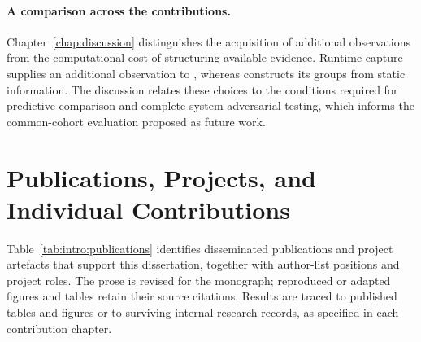 \paragraph{A comparison across the contributions.}
Chapter~\ref{chap:discussion} distinguishes the acquisition of additional observations
from the computational cost of structuring available evidence. Runtime capture supplies
an additional observation to \hybroid{}, whereas \hgann{} constructs its groups from
static information. The discussion relates these choices to the conditions required for
predictive comparison and complete-system adversarial testing, which informs the common-cohort
evaluation proposed as future work.

\section{Publications, Projects, and Individual Contributions}
\label{sec:intro:publications}

Table~\ref{tab:intro:publications} identifies disseminated publications and project
artefacts that support this dissertation, together with author-list positions and project
roles. The prose is revised for the monograph; reproduced or adapted figures and tables
retain their source citations. Results are traced to published tables and figures or to
surviving internal research records, as specified in each contribution chapter.

